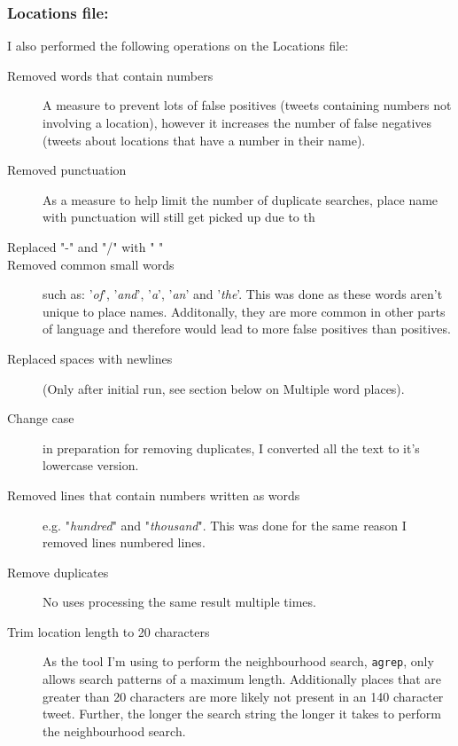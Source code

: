 \documentclass[a4paper]{article}
\begin{document}
\subsubsection{Locations file:}
I also performed the following operations on the Locations file:
\begin{description}
\item[Removed words that contain numbers] A measure to prevent lots of false positives (tweets containing numbers not involving a location), however it increases the number of false negatives (tweets about locations that have a number in their name).
\item[Removed punctuation] As a measure to help limit the number of duplicate searches, place name with punctuation will still get picked up due to th
\item[Replaced "-" and "/" with " "]
\item[Removed common small words] such as: '\textit{of}', '\textit{and}', '\textit{a}', '\textit{an}' and '\textit{the}'. This was done as these words aren't unique to place names. Additonally, they are more common in other parts of language and therefore would lead to more false positives than positives.
\item[Replaced spaces with newlines] (Only after initial run, see section below on Multiple word places).
\item[Change case] in preparation for removing duplicates, I converted all the text to it's lowercase version.
\item[Removed lines that contain numbers written as words] e.g. "\textit{hundred}" and "\textit{thousand}". This was done for the same reason I removed lines numbered lines.
\item[Remove duplicates] No uses processing the same result multiple times.
\item[Trim location length to 20 characters] As the tool I'm using to perform the neighbourhood search, \texttt{agrep}, only allows search patterns of a maximum length. Additionally places that are greater than 20 characters are more likely not present in an 140 character tweet. Further, the longer the search string the longer it takes to perform the neighbourhood search.
\end{description}

\end{document}
